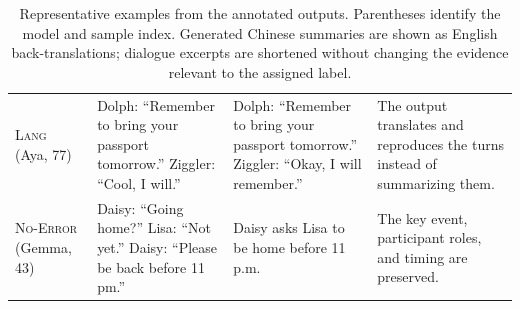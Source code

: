 \documentclass[11pt]{article}
\begin{document}
\begin{table}[t]
\begin{tabularx}{\textwidth}{@{}lXXX@{}}
\textsc{Lang} (Aya, 77) &
Dolph: ``Remember to bring your passport tomorrow.'' Ziggler: ``Cool, I will.'' &
Dolph: ``Remember to bring your passport tomorrow.'' Ziggler: ``Okay, I will remember.'' &
The output translates and reproduces the turns instead of summarizing them. \\

\textsc{No-Error} (Gemma, 43) &
Daisy: ``Going home?'' Lisa: ``Not yet.'' Daisy: ``Please be back before 11 pm.'' &
Daisy asks Lisa to be home before 11 p.m. &
The key event, participant roles, and timing are preserved. \\
\bottomrule
\end{tabularx}
\caption{Representative examples from the annotated outputs. Parentheses identify the model and sample index. Generated Chinese summaries are shown as English back-translations; dialogue excerpts are shortened without changing the evidence relevant to the assigned label.}
\label{tab:taxonomy-examples}
\end{table}
\end{document}
